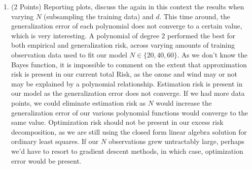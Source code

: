 \documentclass{article}
\begin{document}
\begin{enumerate}
\setcounter{enumi}{\value{saveenum}}
    \item (2 Points) Reporting plots, discuss the again in this context the results when varying $N$ (subsampling the training data) and $d$. 
    \subitem
    This time around, the generalization error of each polynomial does not converge to a certain value, which is very interesting. A polynomial of degree $2$ performed the best for both empirical and generalization risk, across varying amounts of training observation data used to fit our model $N \in \{20,40,60\}$. As we don't know the Bayes function, it is impossible to comment on the extent that approximation risk is present in our current total Risk, as the ozone and wind may or not may be explained by a polynomial relationship. Estimation risk is present in our model as the generalization error does not converge. If we had more data points, we could eliminate estimation risk as $N$ would increase the generalization error of our various polynomial functions would converge to the same value. Optimization risk should not be present in our excess risk decomposition, as we are still using the closed form linear algebra solution for ordinary least squares. If our $N$ observations grew untractably large, perhaps we'd have to resort to gradient descent methods, in which case, optimization error would be present.
\end{enumerate}

\end{document}
